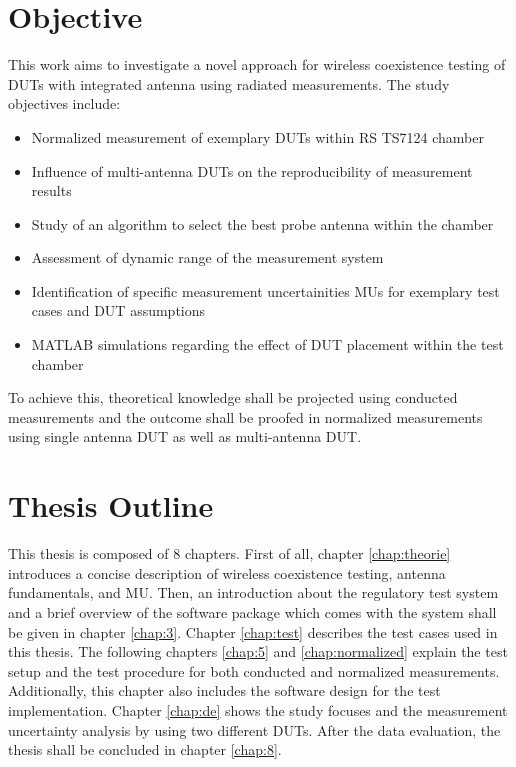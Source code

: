 \section{Objective}
This work aims to investigate a novel approach for wireless coexistence testing of \acsp{DUT} with integrated antenna using radiated measurements. The study objectives include:
\begin{itemize}
\item Normalized measurement of exemplary \acsp{DUT} within \ac{RS} TS7124 chamber
\item Influence of multi-antenna \acsp{DUT} on the reproducibility of measurement results
\item Study of an algorithm to select the best probe antenna within the chamber
\item Assessment of dynamic range of the measurement system
\item Identification of specific measurement uncertainities \acsp{MU} for exemplary test cases and \acs{DUT} assumptions
\item MATLAB simulations regarding the effect of \acs{DUT} placement within the test chamber
\end{itemize}
To achieve this, theoretical knowledge shall be projected using conducted measurements and the outcome shall be proofed in normalized measurements using single antenna \acs{DUT} as well as multi-antenna \acs{DUT}. 

\section{Thesis Outline}
This thesis is composed of 8 chapters. First of all, chapter \ref{chap:theorie} introduces a concise description of wireless coexistence testing, antenna fundamentals, and \acf{MU}. Then, an introduction about the regulatory test system and a brief overview of the software package which comes with the system shall be given in chapter \ref{chap:3}. Chapter  \ref{chap:test} describes the test cases used in this thesis. The following chapters  \ref{chap:5} and  \ref{chap:normalized} explain the test setup and the test procedure for both conducted and normalized measurements. Additionally, this chapter also includes the software design for the test implementation. Chapter \ref{chap:de} shows the study focuses and the measurement uncertainty analysis by using two different \acsp{DUT}. After the data evaluation, the thesis shall be concluded in chapter \ref{chap:8}. 










